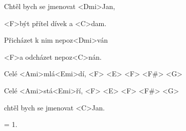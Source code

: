 

\zs
Chtěl bych se jmenovat <Dmi>Jan,

<F>být přítel dívek a <C>dam.

Přicházet k nim nepoz<Dmi>ván

<F>a odcházet nepoz<C>nán.
\ks

\zr
Celé <Ami>mlá<Emi>dí, <F> <E> <F> <F#> <G>

Celé <Ami>stá<Emi>ří, <F> <E> <F> <F#> <G>

chtěl bych se jmenovat <C>Jan.
\kr

\zs
= 1. 
\ks

\kp

